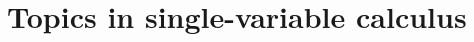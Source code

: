 \documentclass[../book/calcnotes.tex]{subfiles}
\begin{document}
\part{Topics in single-variable calculus}
\label{part:topics}



\end{document}
